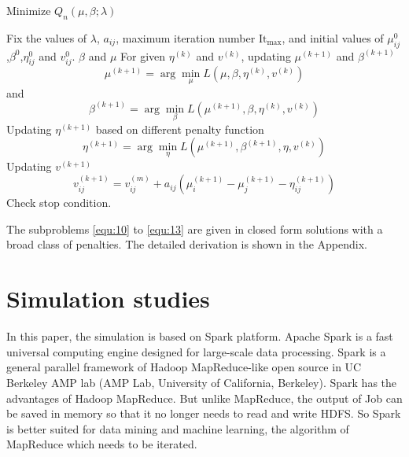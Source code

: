 \documentclass[review]{elsarticle}
\begin{document}
 \begin{algorithm}[H]
 	\caption{Minimize $Q_n(\mu,\beta;\lambda)$}
 	\label{alg:2}
 	\begin{algorithmic}[1]
 		\REQUIRE
 		Fix the values of $\lambda$, $a_{ij}$,  maximum iteration number $\textrm{It}_{\max}$, and initial values of  $\mu_{ij}^0$,$\beta^0$,$\eta_{ij}^0$ and $v_{ij}^0$.
 		\ENSURE $\beta$ and $\mu$
 		\STATE For given $\eta^{(k)}$ and $v^{(k)}$, updating $\mu^{(k+1)}$ and $\beta^{(k+1)}$
 		\begin{equation}\label{equ:10}
 		\mu^{(k+1)} = \arg\min_{\mu}L(\mu,\beta,\eta^{(k)},v^{(k)})
 		\end{equation}
 		and
 		\begin{equation}\label{equ:11}
 		\beta^{(k+1)} = \arg\min_{\beta}L(\mu^{(k+1)},\beta,\eta^{(k)},v^{(k)})
 		\end{equation}
 		\STATE Updating $\eta^{(k+1)}$ based on different penalty function
 		\begin{equation}\label{equ:12}
 		\eta^{(k+1)} = \arg\min_{\eta}L(\mu^{(k+1)},\beta^{(k+1)},\eta,v^{(k)})
 		\end{equation}
 		\STATE Updating $v^{(k+1)}$
 		\begin{equation}\label{equ:13}
 		v_{ij}^{(k+1)}=v_{ij}^{(m)} + a_{ij}(\mu_i^{(k+1)}-\mu_j^{(k+1)}-\eta_{ij}^{(k+1)})
 		\end{equation}
 		\STATE Check stop condition.
 		\ENDFOR
 	\end{algorithmic}
 \end{algorithm}
The subproblems \ref{equ:10} to \ref{equ:13} are given in closed form solutions with a broad class of penalties.
The detailed derivation is shown in the Appendix.
\section{Simulation studies}\label{sec:4}
In this paper, the simulation is based on Spark platform. Apache Spark is a fast universal computing engine designed for large-scale data processing. Spark is a general parallel framework of Hadoop MapReduce-like open source in UC Berkeley AMP lab (AMP Lab, University of California, Berkeley). Spark has the advantages of Hadoop MapReduce. But unlike MapReduce, the output of Job can be saved in memory so that it no longer needs to read and write HDFS. So Spark is better suited for data mining and machine learning, the algorithm of MapReduce which needs to be iterated.
\end{document}
